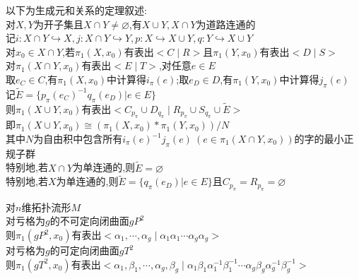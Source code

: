 \begin{zhu}
以下为生成元和关系的定理叙述:\\
对$X,Y$为开子集且$X\cap Y\neq\varnothing$,有$X\cup Y,X\cap Y$为道路连通的\\
记$i:X\cap Y\hookrightarrow X,j:X\cap Y\hookrightarrow Y,p:X\hookrightarrow X\cup Y,q:Y\hookrightarrow X\cup Y$\\
对$x_0\in X\cap Y$,若$\pi_1(X,x_0)$有表出$<C\mid R>$且$\pi_1(Y,x_0)$有表出$<D\mid S>$\\
对$\pi_1(X\cap Y,x_0)$有表出$<E\mid T>$,对任意$e\in E$\\
取$e_{C}\in C$,有$\pi_1(X,x_0)$中计算得$i_{\pi}(e)$;取$e_{D}\in D$,有$\pi_1(Y,x_0)$中计算得$j_{\pi}(e)$\\
记$\widetilde{E}=\{p_{\pi}(e_C)^{-1}q_{\pi}(e_D)|e\in E\}$\\
则$\pi_1(X\cup Y,x_0)$有表出$<C_{p_{\pi}}\cup D_{q_{\pi}}\mid R_{p_{\pi}}\cup S_{q_{\pi}}\cup \widetilde{E}>$\\
即$\pi_1(X\cup Y,x_0)\cong (\pi_1(X,x_0)*\pi_1(Y,x_0))/N$\\
其中$N$为自由积中包含所有$i_{\pi}(e)^{-1}j_{\pi}(e)\ (e\in\pi_1(X\cap Y,x_0))$的字的最小正规子群\\
特别地,若$X\cap Y$为单连通的,则$\widetilde{E}=\varnothing$\\
特别地,若$X$为单连通的,则$\widetilde{E}=\{q_{\pi}(e_{D})|e\in E\}$且$C_{p_{\pi}}=R_{p_{\pi}}=\varnothing$
\end{zhu}

\begin{dingli}
对$n$维拓扑流形$M$\\
对亏格为$g$的不可定向闭曲面$gP^2$\\
则$\pi_1(gP^2,x_0)$有表出$<\alpha_1,\cdots,\alpha_g\mid \alpha_1\alpha_1\cdots\alpha_g\alpha_g>$\\
对亏格为$g$的可定向闭曲面$gT^2$\\
则$\pi_1(gT^2,x_0)$有表出$<\alpha_1,\beta_1,\cdots,\alpha_g,\beta_g\mid \alpha_1\beta_1\alpha_1^{-1}\beta_1^{-1}\cdots\alpha_g\beta_g\alpha_g^{-1}\beta_g^{-1}>$
\end{dingli}

